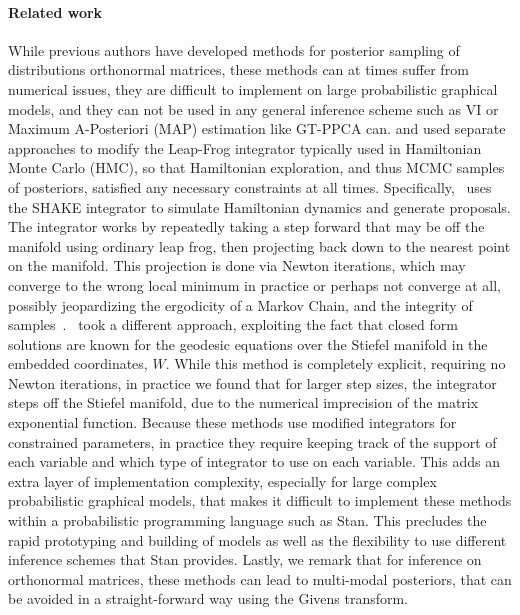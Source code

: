 \documentclass{article}
\begin{document}
\paragraph{Related work} While previous authors have developed methods for posterior sampling of distributions orthonormal matrices, these methods can at times suffer from numerical issues, they are difficult to implement on large probabilistic graphical models, and they can not be used in any general inference scheme such as VI or Maximum A-Posteriori (MAP) estimation like GT-PPCA can. \citet{brubaker2012family} and 
\citet{byrne2013geodesic} used separate approaches to modify the Leap-Frog integrator typically used in Hamiltonian Monte Carlo (HMC), so that Hamiltonian exploration, and thus MCMC samples of posteriors, satisfied any necessary constraints at all times. Specifically,~\citet{brubaker2012family} uses the SHAKE integrator \citep{leimkuhler2004simulating} to simulate Hamiltonian dynamics and generate proposals. The integrator works by repeatedly taking a step forward that may be off the manifold using ordinary leap frog, then projecting back down to the nearest point on the manifold. This projection is done via Newton iterations, which may converge to the wrong local minimum in practice or perhaps not converge at all, possibly jeopardizing the ergodicity of a Markov Chain, and the integrity of samples~\citep{betancourt2017divergences}. \citet{byrne2013geodesic}~took a different approach, exploiting the fact that closed form solutions are known for the geodesic equations over the Stiefel manifold in the embedded coordinates, $W$. While this method is completely explicit, requiring no Newton iterations, in practice we found that for larger step sizes, the integrator steps off the Stiefel manifold, due to the numerical imprecision of the matrix exponential function. Because these methods use modified integrators for constrained parameters, in practice they require keeping track of the support of each variable and which type of integrator to use on each variable. This adds an extra layer of implementation complexity, especially for large complex probabilistic graphical models, that makes it difficult to implement these methods within a probabilistic programming language such as Stan. This precludes the rapid prototyping and building of models as well as the flexibility to use different inference schemes that Stan provides. Lastly, we remark that for inference on orthonormal matrices, these methods can lead to multi-modal posteriors, that can be avoided in a straight-forward way using the Givens transform.
\end{document}
